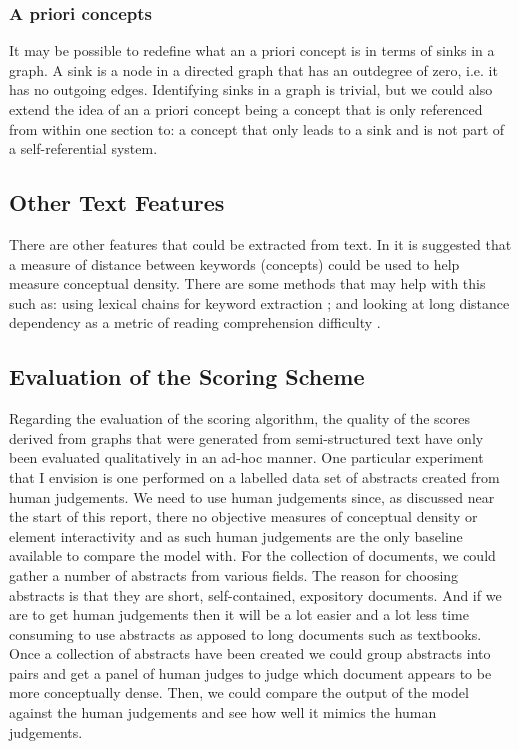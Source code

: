 \documentclass[12pt]{article}
\begin{document}
\subsubsection{A priori concepts}
It may be possible to redefine what an a priori concept is in terms of sinks in a graph. A sink is a node in a directed graph that has an outdegree of zero, i.e. it has no outgoing edges. Identifying sinks in a graph is trivial, but we could also extend the idea of an a priori concept being a concept that is only referenced from within one section to: a concept that only leads to a sink and is not part of a self-referential system. 

\subsection{Other Text Features}
There are other features that could be extracted from text.
In \citep{robins2010learning} it is suggested that a measure of distance between keywords (concepts) could be used to help measure conceptual density. There are some methods that may help with this such as: using lexical chains for keyword extraction \citep{ercan2007using}; and looking at long distance dependency as a metric of reading comprehension difficulty \citep{liu2008dependency}. 

\subsection{Evaluation of the Scoring Scheme} \label{sec:evaluation_of_the_model}
Regarding the evaluation of the scoring algorithm, the quality of the scores derived from graphs that were generated from semi-structured text have only been evaluated qualitatively in an ad-hoc manner. One particular experiment that I envision is one performed on a labelled data set of abstracts created from human judgements. We need to use human judgements since, as discussed near the start of this report, there no objective measures of conceptual density or element interactivity and as such human judgements are the only baseline available to compare the model with. For the collection of documents, we could gather a number of abstracts from various fields. The reason for choosing abstracts is that they are short, self-contained, expository documents. And if we are to get human judgements then it will be a lot easier and a lot less time consuming to use abstracts as apposed to long documents such as textbooks. Once a collection of abstracts have been created we could group abstracts into pairs and get a panel of human judges to judge which document appears to be more conceptually dense.  Then, we could compare the output of the model against the human judgements and see how well it mimics the human judgements.
\end{document}
